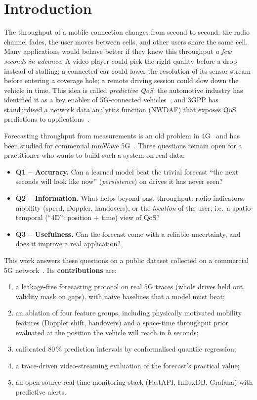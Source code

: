 \documentclass[10pt,a4paper,twocolumn]{article}
\begin{document}
\section{Introduction}

The throughput of a mobile connection changes from second to second: the radio channel
fades, the user moves between cells, and other users share the same cell. Many applications
would behave better if they knew this throughput \emph{a few seconds in advance}. A video
player could pick the right quality before a drop instead of stalling; a connected car could
lower the resolution of its sensor stream before entering a coverage hole; a remote driving
session could slow down the vehicle in time. This idea is called \emph{predictive QoS}: the
automotive industry has identified it as a key enabler of 5G-connected
vehicles~\cite{5gaa}, and 3GPP has standardised a network data analytics function (NWDAF)
that exposes QoS predictions to applications~\cite{nwdaf}.

Forecasting throughput from measurements is an old problem in 4G~\cite{linkforecast} and
has been studied for commercial mmWave 5G~\cite{lumos5g}. Three questions remain open for
a practitioner who wants to build such a system on real data:
\begin{itemize}
\item \textbf{Q1 -- Accuracy.} Can a learned model beat the trivial forecast ``the next
seconds will look like now'' (\emph{persistence}) on drives it has never seen?
\item \textbf{Q2 -- Information.} What helps beyond past throughput: radio indicators,
mobility (speed, Doppler, handovers), or the \emph{location} of the user, i.e.\ a
spatio-temporal (``4D'': position + time) view of QoS?
\item \textbf{Q3 -- Usefulness.} Can the forecast come with a reliable uncertainty, and does
it improve a real application?
\end{itemize}

This work answers these questions on a public dataset collected on a commercial 5G
network~\cite{raca2020}. Its \textbf{contributions} are:
\begin{enumerate}
\item a leakage-free forecasting protocol on real 5G traces (whole drives held out,
validity mask on gaps), with naive baselines that a model must beat;
\item an ablation of four feature groups, including physically motivated mobility
features (Doppler shift, handovers) and a space-time throughput prior evaluated at the
position the vehicle will reach in $h$ seconds;
\item calibrated 80\,\% prediction intervals by conformalised quantile regression;
\item a trace-driven video-streaming evaluation of the forecast's practical value;
\item an open-source real-time monitoring stack (FastAPI, InfluxDB, Grafana) with
predictive alerts.
\end{enumerate}
\end{document}
